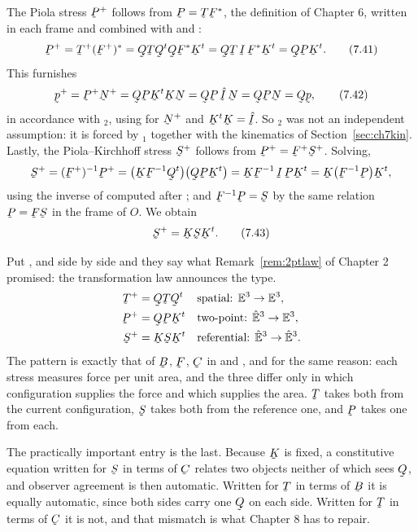 The Piola stress $\bP^{+}$ follows from $\bP=\bT\bF^{*}$, the definition
of Chapter 6, written in each frame and combined with  and
:
\begin{equation}
   \bP^{+}=\bT^{+}(\bF^{+})^{*}=\bQ\bT\bQ^{t}\bQ\bF^{*}\bK^{t}
   =\bQ\bT\,\I\,\bF^{*}\bK^{t}=\bQ\bP\bK^{t}.
   \tag{7.41}\label{eq:7.41}
\end{equation}
This furnishes
\begin{equation}
   \bp^{+}=\bP^{+}\bN^{+}=\bQ\bP\bK^{t}\bK\bN=\bQ\bP\,\hI\,\bN
   =\bQ\bP\bN=\bQ\bp ,
   \tag{7.42}\label{eq:7.42}
\end{equation}
in accordance with $_{2}$, using  for $\bN^{+}$ and
$\bK^{t}\bK=\hI$. So $_{2}$ was not an independent assumption:
it is forced by $_{1}$ together with the kinematics of
Section~\ref{sec:ch7kin}. Lastly, the Piola--Kirchhoff stress $\bS^{+}$
follows from $\bP^{+}=\bF^{+}\bS^{+}$. Solving,
\[
   \bS^{+}=(\bF^{+})^{-1}\bP^{+}
   =\big(\bK\bF^{-1}\bQ^{t}\big)\big(\bQ\bP\bK^{t}\big)
   =\bK\bF^{-1}\,\I\,\bP\bK^{t}=\bK\big(\bF^{-1}\bP\big)\bK^{t},
\]
using the inverse of  computed after ; and
$\bF^{-1}\bP=\bS$ by the same relation $\bP=\bF\bS$ in the frame of $O$.
We obtain
\begin{equation}
   \bS^{+}=\bK\bS\bK^{t}.
   \tag{7.43}\label{eq:7.43}
\end{equation}

\begin{remark}\label{rem:ch7threestress}
Put ,  and  side by side and they say what
Remark~\ref{rem:2ptlaw} of Chapter 2 promised: the transformation law
announces the type.
\[
\begin{aligned}
   \bT^{+}&=\bQ\bT\bQ^{t}
     &&\text{spatial: }\Et\to\Et ,\\
   \bP^{+}&=\bQ\bP\bK^{t}
     &&\text{two-point: }\hEt\to\Et ,\\
   \bS^{+}&=\bK\bS\bK^{t}
     &&\text{referential: }\hEt\to\hEt .
\end{aligned}
\]
The pattern is exactly that of $\bB$, $\bF$, $\bC$ in  and
, and for the same reason: each stress measures force per unit
area, and the three differ only in which configuration supplies the
force and which supplies the area. $\bT$ takes both from the current
configuration, $\bS$ takes both from the reference one, and $\bP$ takes
one from each.

The practically important entry is the last. Because $\bK$ is fixed, a
constitutive equation written for $\bS$ in terms of $\bC$ relates two
objects neither of which sees $\bQ$, and observer agreement is then
automatic. Written for $\bT$ in terms of $\bB$ it is equally automatic,
since both sides carry one $\bQ$ on each side. Written for $\bT$ in terms
of $\bC$ it is not, and that mismatch is what Chapter 8 has to repair.
\end{remark}


